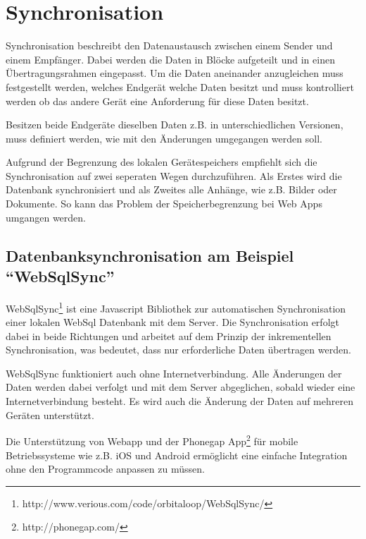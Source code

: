 %
\chapter{Synchronisation}
\label{sec:Synchronisation}


Synchronisation beschreibt den Datenaustausch zwischen einem Sender und einem Empfänger. Dabei werden die Daten in Blöcke aufgeteilt und in einen Übertragungsrahmen eingepasst. Um die Daten aneinander anzugleichen muss festgestellt werden, welches Endgerät welche Daten besitzt und muss kontrolliert werden ob das andere Gerät eine Anforderung für diese Daten besitzt.

Besitzen beide Endgeräte dieselben Daten z.B. in unterschiedlichen Versionen, muss definiert werden, wie mit den Änderungen umgegangen werden soll.\cite[]{WEB:SYNCML:2014}

Aufgrund der Begrenzung des lokalen Gerätespeichers empfiehlt sich die Synchronisation auf zwei seperaten Wegen durchzuführen. Als Erstes wird die Datenbank synchronisiert und als Zweites alle Anhänge, wie z.B. Bilder oder Dokumente. So kann das Problem der Speicherbegrenzung bei Web Apps umgangen werden.

\section{Datenbanksynchronisation am Beispiel ``WebSqlSync''}
\label{sec:dbsync}

WebSqlSync\footnote{http://www.verious.com/code/orbitaloop/WebSqlSync/} ist eine Javascript Bibliothek zur automatischen Synchronisation einer lokalen WebSql Datenbank mit dem Server. Die Synchronisation erfolgt dabei in beide Richtungen und arbeitet auf dem Prinzip der inkrementellen Synchronisation, was bedeutet, dass nur erforderliche Daten übertragen werden.

WebSqlSync funktioniert auch ohne Internetverbindung. Alle Änderungen der Daten werden dabei verfolgt und mit dem Server abgeglichen, sobald wieder eine Internetverbindung besteht. Es wird auch die Änderung der Daten auf mehreren Geräten unterstützt.

Die Unterstützung von Webapp und der Phonegap App\footnote{http://phonegap.com/} für mobile Betriebssysteme wie z.B. iOS und Android ermöglicht eine einfache Integration ohne den Programmcode anpassen zu müssen.\cite[]{WEB:WEBSQLSYNC:2014}

